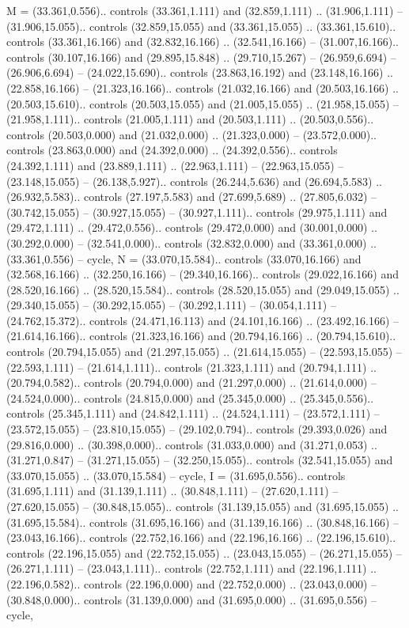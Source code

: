 {M} = {(33.361,0.556).. controls (33.361,1.111) and (32.859,1.111) .. (31.906,1.111) -- (31.906,15.055).. controls (32.859,15.055) and (33.361,15.055) .. (33.361,15.610).. controls (33.361,16.166) and (32.832,16.166) .. (32.541,16.166) -- (31.007,16.166).. controls (30.107,16.166) and (29.895,15.848) .. (29.710,15.267) -- (26.959,6.694) -- (26.906,6.694) -- (24.022,15.690).. controls (23.863,16.192) and (23.148,16.166) .. (22.858,16.166) -- (21.323,16.166).. controls (21.032,16.166) and (20.503,16.166) .. (20.503,15.610).. controls (20.503,15.055) and (21.005,15.055) .. (21.958,15.055) -- (21.958,1.111).. controls (21.005,1.111) and (20.503,1.111) .. (20.503,0.556).. controls (20.503,0.000) and (21.032,0.000) .. (21.323,0.000) -- (23.572,0.000).. controls (23.863,0.000) and (24.392,0.000) .. (24.392,0.556).. controls (24.392,1.111) and (23.889,1.111) .. (22.963,1.111) -- (22.963,15.055) -- (23.148,15.055) -- (26.138,5.927).. controls (26.244,5.636) and (26.694,5.583) .. (26.932,5.583).. controls (27.197,5.583) and (27.699,5.689) .. (27.805,6.032) -- (30.742,15.055) -- (30.927,15.055) -- (30.927,1.111).. controls (29.975,1.111) and (29.472,1.111) .. (29.472,0.556).. controls (29.472,0.000) and (30.001,0.000) .. (30.292,0.000) -- (32.541,0.000).. controls (32.832,0.000) and (33.361,0.000) .. (33.361,0.556) -- cycle},
{N} = {(33.070,15.584).. controls (33.070,16.166) and (32.568,16.166) .. (32.250,16.166) -- (29.340,16.166).. controls (29.022,16.166) and (28.520,16.166) .. (28.520,15.584).. controls (28.520,15.055) and (29.049,15.055) .. (29.340,15.055) -- (30.292,15.055) -- (30.292,1.111) -- (30.054,1.111) -- (24.762,15.372).. controls (24.471,16.113) and (24.101,16.166) .. (23.492,16.166) -- (21.614,16.166).. controls (21.323,16.166) and (20.794,16.166) .. (20.794,15.610).. controls (20.794,15.055) and (21.297,15.055) .. (21.614,15.055) -- (22.593,15.055) -- (22.593,1.111) -- (21.614,1.111).. controls (21.323,1.111) and (20.794,1.111) .. (20.794,0.582).. controls (20.794,0.000) and (21.297,0.000) .. (21.614,0.000) -- (24.524,0.000).. controls (24.815,0.000) and (25.345,0.000) .. (25.345,0.556).. controls (25.345,1.111) and (24.842,1.111) .. (24.524,1.111) -- (23.572,1.111) -- (23.572,15.055) -- (23.810,15.055) -- (29.102,0.794).. controls (29.393,0.026) and (29.816,0.000) .. (30.398,0.000).. controls (31.033,0.000) and (31.271,0.053) .. (31.271,0.847) -- (31.271,15.055) -- (32.250,15.055).. controls (32.541,15.055) and (33.070,15.055) .. (33.070,15.584) -- cycle},
{I} = {(31.695,0.556).. controls (31.695,1.111) and (31.139,1.111) .. (30.848,1.111) -- (27.620,1.111) -- (27.620,15.055) -- (30.848,15.055).. controls (31.139,15.055) and (31.695,15.055) .. (31.695,15.584).. controls (31.695,16.166) and (31.139,16.166) .. (30.848,16.166) -- (23.043,16.166).. controls (22.752,16.166) and (22.196,16.166) .. (22.196,15.610).. controls (22.196,15.055) and (22.752,15.055) .. (23.043,15.055) -- (26.271,15.055) -- (26.271,1.111) -- (23.043,1.111).. controls (22.752,1.111) and (22.196,1.111) .. (22.196,0.582).. controls (22.196,0.000) and (22.752,0.000) .. (23.043,0.000) -- (30.848,0.000).. controls (31.139,0.000) and (31.695,0.000) .. (31.695,0.556) -- cycle},
